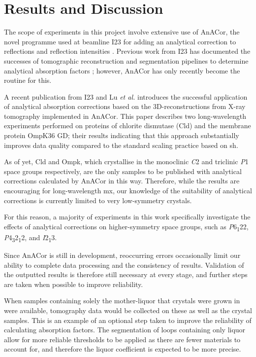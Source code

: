\section{Results and Discussion}

The scope of experiments in this project involve extensive use of AnACor, the novel programme used at beamline I23 for adding an analytical correction to reflections and reflection intensities \cite{Lu2024}. Previous work from I23 has documented the successes of tomographic reconstruction and segmentation pipelines to determine analytical absorption factors \cite{Kazantsev2021}; however, AnACor has only recently become the routine for this.

A recent publication from I23 and Lu \textit{et al.} \cite{Lu2024} introduces the successful application of analytical absorption corrections based on the 3D-reconstructions from X-ray tomography implemented in AnACor. This paper describes two long-wavelength experiments performed on proteins of chlorite dismutase (Cld) and the membrane protein OmpK36 GD; their results indicating that this approach substantially improves data quality compared to the standard scaling practice based on \ac{sh}.

As of yet, Cld and Ompk, which crystallise in the monoclinic \textit{C}2 and triclinic \textit{P}1 space groups respectively, are the only samples to be published with analytical corrections calculated by AnACor in this way. Therefore, while the results are encouraging for long-wavelength \ac{mx}, our knowledge of the suitability of analytical corrections is currently limited to very low-symmetry crystals.

For this reason, a majority of experiments in this work specifically investigate the effects of analytical corrections on higher-symmetry space groups, such as \textit{P}6\textsubscript{1}22, \textit{P}4\textsubscript{3}2\textsubscript{1}2, and \textit{I}2\textsubscript{1}3.

Since AnACor is still in development, reoccurring errors occasionally limit our ability to complete data processing and the consistency of results. Validation of the outputted results is therefore still necessary at every stage, and further steps are taken when possible to improve reliability.

When samples containing solely the mother-liquor that crystals were grown in were available, tomography data would be collected on these as well as the crystal samples. This is an example of an optional step taken to improve the reliability of calculating absorption factors. The segmentation of loops containing only liquor allow for more reliable thresholds to be applied as there are fewer materials to account for, and therefore the liquor coefficient is expected to be more precise.

